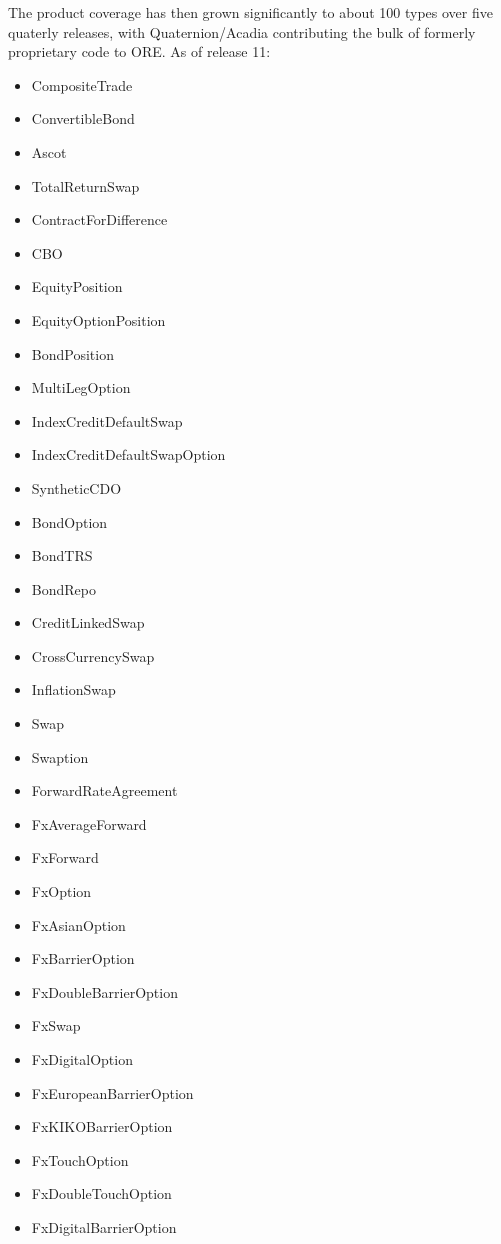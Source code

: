 \documentclass[12pt, a4paper]{report}
\begin{document}
The product coverage has then grown significantly to about 100 types over five quaterly releases, with Quaternion/Acadia contributing the bulk of formerly proprietary code to ORE. As of release 11:
\begin{itemize}
      \item CompositeTrade
      \item ConvertibleBond
      \item Ascot
      \item TotalReturnSwap
      \item ContractForDifference
      \item CBO
      \item EquityPosition
      \item EquityOptionPosition
      \item BondPosition
      \item MultiLegOption
      \item IndexCreditDefaultSwap
      \item IndexCreditDefaultSwapOption
      \item SyntheticCDO
      \item BondOption
      \item BondTRS
      \item BondRepo
      \item CreditLinkedSwap
      \item CrossCurrencySwap
      \item InflationSwap
      \item Swap
      \item Swaption
      \item ForwardRateAgreement
      \item FxAverageForward
      \item FxForward
      \item FxOption
      \item FxAsianOption
      \item FxBarrierOption
      \item FxDoubleBarrierOption
      \item FxSwap
      \item FxDigitalOption
      \item FxEuropeanBarrierOption
      \item FxKIKOBarrierOption
      \item FxTouchOption
      \item FxDoubleTouchOption
      \item FxDigitalBarrierOption

\end{itemize}
\end{document}
